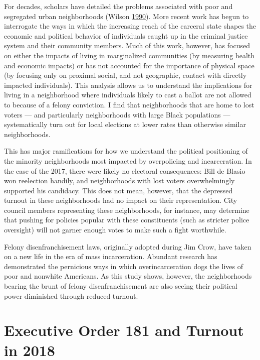 \documentclass[]{article}
\begin{document}
For decades, scholars have detailed the problems associated with poor and segregated urban neighborhoods (Wilson \protect\hyperlink{ref-Wilson1990}{1990}). More recent work has begun to interrogate the ways in which the increasing reach of the carceral state shapes the economic and political behavior of individuals caught up in the criminal justice system and their community members. Much of this work, however, has focused on either the impacts of living in marginalized communities (by measuring health and economic impacts) or has not accounted for the importance of physical space (by focusing only on proximal social, and not geographic, contact with directly impacted individuals). This analysis allows us to understand the implications for living in a neighborhood where individuals likely to cast a ballot are not allowed to because of a felony conviction. I find that neighborhoods that are home to lost voters --- and particularly neighborhoods with large Black populations --- systematically turn out for local elections at lower rates than otherwise similar neighborhoods.

This has major ramifications for how we understand the political positioning of the minority neighborhoods most impacted by overpolicing and incarceration. In the case of the 2017, there were likely no electoral consequences: Bill de Blasio won reelection handily, and neighborhoods with lost voters overwhelmingly supported his candidacy. This does not mean, however, that the depressed turnout in these neighborhoods had no impact on their representation. City council members representing these neighborhoods, for instance, may determine that pushing for policies popular with these constituents (such as stricter police oversight) will not garner enough votes to make such a fight worthwhile.

Felony disenfranchisement laws, originally adopted during Jim Crow, have taken on a new life in the era of mass incarceration. Abundant research has demonstrated the pernicious ways in which overincarceration dogs the lives of poor and nonwhite Americans. As this study shows, however, the neighborhoods bearing the brunt of felony disenfranchisement are also seeing their political power diminished through reduced turnout.

\pagebreak

\hypertarget{executive-order-181-and-turnout-in-2018}{%
\section{Executive Order 181 and Turnout in 2018}\label{executive-order-181-and-turnout-in-2018}}
\end{document}
